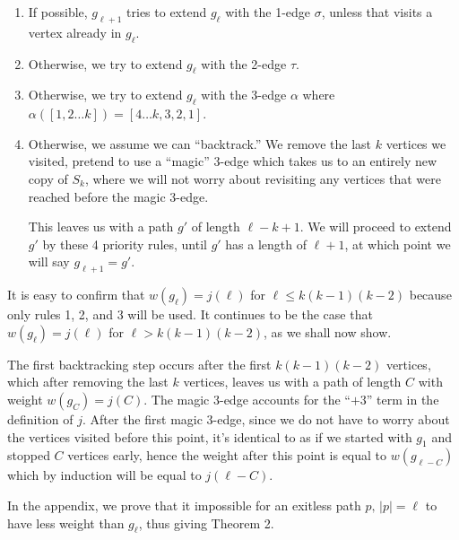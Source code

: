 \documentclass{article}
\newcommand{\hide}[1]{}
\newcommand{\edit}[1]{}%
\newcommand{\dc}[1]{}%
\begin{document}
\begin{enumerate}
    \item If possible, $g_{\ell+1}$ tries to extend $g_\ell$ with the 1-edge $\sigma$\dc{$\sigma$ of something, since $\sigma$ is a function}, unless that visits a vertex already in $g_\ell$.
    \item Otherwise, we try to extend $g_\ell$ with the 2-edge $\tau$\dc{ of something}\dc{ if doing so would not...}.
    \item Otherwise, we try to extend $g_\ell$ with the 3-edge $\alpha$\dc{ of something} where $\alpha([1,2\dots k]) = [4\dots k, 3,2,1]$\dc{ if doing so would not...}.
    \item Otherwise, we assume we can ``backtrack.'' We remove the last $k$ vertices we visited, pretend to use a ``magic'' 3-edge which takes us to an entirely new copy of $S_k$, where we will not worry about revisiting any vertices that were reached before the magic 3-edge. 
    
    This leaves us with a path $g'$ of length $\ell-k+1$. We will proceed to extend $g'$ by these 4 priority rules, until $g'$ has a length of $\ell+1$, at which point we will say $g_{\ell+1} = g'$.
\end{enumerate} 

It is easy to confirm that $w(g_\ell)= j(\ell)$ for $\ell \leq k(k-1)(k-2)$ because only rules 1, 2, and 3  will be used. It continues to be the case that $w(g_{\ell}) = j(\ell)$ for $\ell > k(k-1)(k-2)$, as we shall now show.

\vspace{1.75em}
The first backtracking step occurs after the first $k(k-1)(k-2)$ vertices, which after removing the last $k$ vertices, leaves us with a path of length $C$ with weight $w(g_C) = j(C)$. The magic 3-edge accounts for the ``$+3$'' term in the definition of $j$. After the first magic 3-edge, since we do not have to worry about the vertices visited before this point, it's identical to as if we started with $g_1$ and stopped $C$ vertices early, hence the weight after this point is equal to $w(g_{\ell-C})$ which by induction will be equal to $j(\ell-C)$.

\vspace{1.75em}
In the appendix,\edit{ ref} we prove that it impossible for an exitless path $p,\,|p| = \ell$ to have less weight than $g_\ell$, thus giving Theorem 2\edit{ ref}.
\hide{
We may simplify the second case by noting that $j(C) +3 = C +C/k + (C+k)/k(k-1)$. Thus, with $q = \lceil (\ell-k(k-1)(k-2))/C\rceil$, we have
\[
    j(\ell-C) + j(C)+3 = \ell + \left\lceil \frac{\ell}{k}\right\rceil + \left\lceil \frac{\ell+qk}{k(k-1)}\right\rceil -3\]
. We letting $f_2,f_3$ be what is added to the 2nd/3rd term when the ceiling is taken, we have:

\[j(\ell) = \ell\left(1+ \frac{1}{k} + \frac{1}{k(k-1)}\right) + f_2+f_3-3\]}
\end{document}
